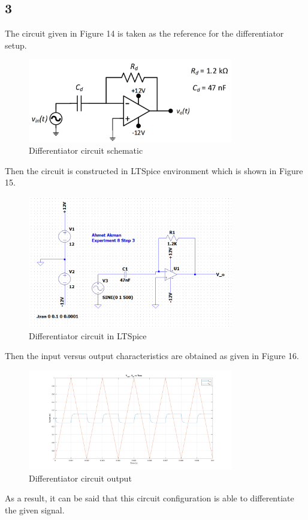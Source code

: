 \documentclass[letterpaper,12pt]{article}
\begin{document}
\subsection{3}
The circuit given in Figure 14 is taken as the reference for the differentiator setup.
\begin{figure}[H]
	\centering
   \includegraphics[width=0.8\textwidth]{differentiator.png}
   \caption{Differentiator circuit schematic}
\end{figure} 
Then the circuit is constructed in LTSpice environment which is shown in Figure 15.
\begin{figure}[H]
	\centering
   \includegraphics[width=0.8\textwidth]{differentiator_sim.png}
   \caption{Differentiator circuit in LTSpice}
\end{figure} 
Then the input versus output characteristics are obtained as given in Figure 16.
\begin{figure}[H]
	\centering
   \includegraphics[width=0.8\textwidth]{differentiator_1.png}
   \caption{Differentiator circuit output}
\end{figure} 
As a result, it can be said that this circuit configuration is able to differentiate the given signal. 
\end{document}
